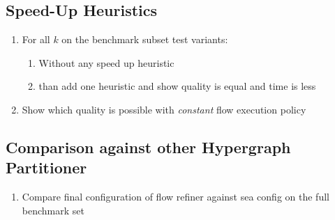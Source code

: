 
\subsection{Speed-Up Heuristics}

\begin{enumerate}
\item For all $k$ on the benchmark subset test variants:
\begin{enumerate}
\item Without any speed up heuristic
\item than add one heuristic and show quality is equal and time is less
\end{enumerate}
\item Show which quality is possible with \emph{constant} flow execution policy
\end{enumerate}

\subsection{Comparison against other Hypergraph Partitioner}

\begin{enumerate}
\item Compare final configuration of flow refiner against sea config on the full benchmark set
\end{enumerate}



